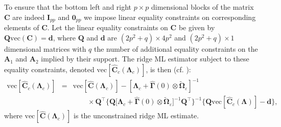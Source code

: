 To ensure that the bottom left and right $p \times p$ dimensional blocks of the matrix $\mathbf{C}$ are indeed $\mathbf{I}_{pp}$ and $\mathbf{0}_{pp}$ we impose linear equality constraints on corresponding elements of $\mathbf{C}$. Let the linear equality constraints on $\mathbf{C}$ be given by $\mathbf{Q} \textrm{vec}(\mathbf{C})=\mathbf{d}$, where $\mathbf{Q}$ and $\mathbf{d}$ are $(2p^2+q)\times 4p^2$ and $(2p^2+q)\times 1$ dimensional matrices with $q$ the number of additional equality constraints on the $\mathbf{A}_1$ and $\mathbf{A}_2$ implied by their support. The ridge ML estimator subject to these equality constraints, denoted $\mbox{vec}[ \widehat{\mathbf{C}}_c(\boldsymbol{\Lambda}_c) ]$, is then (cf. \cite{Miok2017}):
\begin{eqnarray*}
\mbox{vec}[ \widehat{\mathbf{C}}_c(\boldsymbol{\Lambda}_c) ] & = & \mbox{vec}[ \widehat{\mathbf{C}}(\boldsymbol{\Lambda}_c) ] - [ \boldsymbol{\Lambda}_c+\hat{\boldsymbol{\Gamma}}(0) \otimes \tilde{\boldsymbol{\Omega}}_{\varepsilon} ]^{-1}
\\
& & \qquad \times \mathbf{Q}^{\top} \big\{ \mathbf{Q} \big[ \mathbf{\Lambda}_c + \hat{\boldsymbol{\Gamma}}(0) \otimes \tilde{\boldsymbol{\Omega}}_{\varepsilon} \big]^{-1} \mathbf{Q}^{\top} \big\}^{-1} \big\{ \mathbf{Q} \textrm{vec}[ \widehat{\mathbf{C}}_c(\boldsymbol{\Lambda})]-\mathbf{d} \big\},
\end{eqnarray*}
where $\mbox{vec}[ \hat{\mathbf{C}}(\boldsymbol{\Lambda}_c) ]$ is the unconstrained ridge ML estimate.


